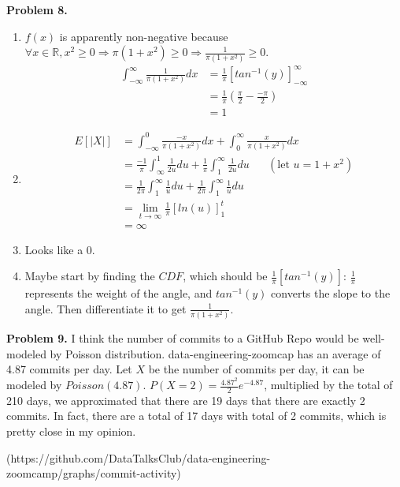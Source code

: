 \documentclass{article}
\begin{document}
\textbf{Problem 8.}
\begin{enumerate}[label={(\alph*)}]
    \item 
    $f(x)$ is apparently non-negative because $\forall x \in \mathbb{R}, x^2 \ge 0 \Rightarrow \pi(1+x^2) \ge 0 \Rightarrow \frac{1}{\pi(1+x^2)} \ge 0$.
    \begin{align}
        \int_{-\infty}^{\infty}\frac{1}{\pi(1+x^2)}dx & = \frac{1}{\pi}\left[tan^{-1}(y)\right]_{-\infty}^{\infty} \\
        & = \frac{1}{\pi}\left(\frac{\pi}{2}-\frac{-\pi}{2}\right) \\
        & = 1
    \end{align}

    \item 
    \begin{align}
        E[|X|] & = \int_{-\infty}^{0}\frac{-x}{\pi(1+x^2)}dx + \int_{0}^{\infty}\frac{x}{\pi(1+x^2)}dx \\
        & = \frac{-1}{\pi}\int_{\infty}^{1}\frac{1}{2u}du + \frac{1}{\pi}\int_{1}^{\infty}\frac{1}{2u}du \;\;\;\;\;\; \left(\text{let } u = 1+x^2\right)\\
        & = \frac{1}{2\pi} \int_{1}^{\infty}\frac{1}{u}du + \frac{1}{2\pi} \int_{1}^{\infty}\frac{1}{u}du \\
        & = \lim_{t \rightarrow \infty}\frac{1}{\pi} \left[ln(u)\right]_1^{t} \\
        & = \infty
    \end{align}

    \item Looks like a 0.
    
    \item Maybe start by finding the $CDF$, which should be $\frac{1}{\pi}\left[tan^{-1}(y)\right]$: $\frac{1}{\pi}$ represents the weight of the angle, and $tan^{-1}(y)$ converts the slope to the angle. 
    Then differentiate it to get $\frac{1}{\pi(1+x^2)}$.
\end{enumerate}
\bigbreak

\textbf{Problem 9.} I think the number of commits to a GitHub Repo would be well-modeled by Poisson distribution.
data-engineering-zoomcap has an average of 4.87 commits per day. Let $X$ be the number of commits per day, it can be modeled by $Poisson(4.87)$. 
$P(X=2) = \frac{4.87^2}{2}e^{-4.87}$, multiplied by the total of 210 days, we approximated that there are 19 days that there are exactly 2 commits.
In fact, there are a total of 17 days with total of 2 commits, which is pretty close in my opinion.


(https://github.com/DataTalksClub/data-engineering-zoomcamp/graphs/commit-activity)
\end{document}

